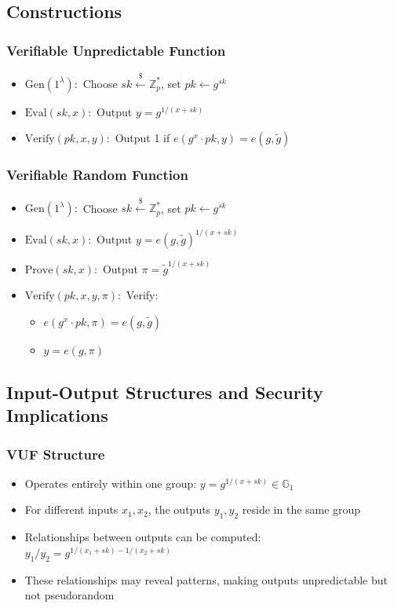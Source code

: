 \subsection{Constructions}

\subsubsection{Verifiable Unpredictable Function}
\begin{itemize}
    \item $\text{Gen}(1^\lambda):$ Choose $sk \stackrel{\$}{\leftarrow} \mathbb{Z}_p^*$, set $pk \leftarrow g^{sk}$
    \item $\text{Eval}(sk, x):$ Output $y = g^{1/(x + sk)}$
    \item $\text{Verify}(pk, x, y):$ Output 1 if $e(g^x \cdot pk, y) = e(g, \tilde{g})$
\end{itemize}

\subsubsection{Verifiable Random Function}
\begin{itemize}
    \item $\text{Gen}(1^\lambda):$ Choose $sk \stackrel{\$}{\leftarrow} \mathbb{Z}_p^*$, set $pk \leftarrow g^{sk}$
    \item $\text{Eval}(sk, x):$ Output $y = e(g, \tilde{g})^{1/(x + sk)}$
    \item $\text{Prove}(sk, x):$ Output $\pi = \tilde{g}^{1/(x + sk)}$
    \item $\text{Verify}(pk, x, y, \pi):$ Verify:
    \begin{itemize}
        \item $e(g^x \cdot pk, \pi) = e(g, \tilde{g})$ 
        \item $y = e(g, \pi)$
    \end{itemize}
\end{itemize}

\subsection{Input-Output Structures and Security Implications}

\subsubsection{VUF Structure}
\begin{itemize}
    \item Operates entirely within one group: $y = g^{1/(x + sk)} \in \mathbb{G}_1$
    \item For different inputs $x_1, x_2$, the outputs $y_1, y_2$ reside in the same group
    \item Relationships between outputs can be computed: $y_1/y_2 = g^{1/(x_1 + sk) - 1/(x_2 + sk)}$
    \item These relationships may reveal patterns, making outputs unpredictable but not pseudorandom
\end{itemize}

